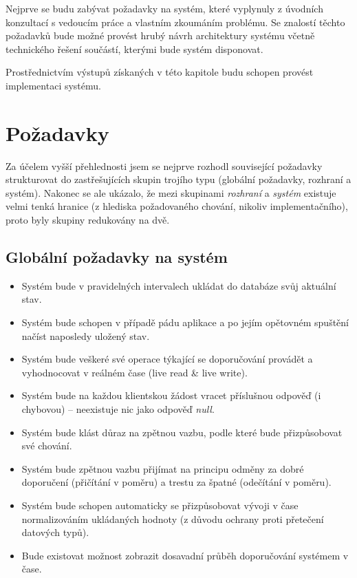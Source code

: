 \documentclass[thesis=M,czech]{FITthesis}[2014/05/07]
\begin{document}
Nejprve se budu zabývat požadavky na systém, které vyplynuly z úvodních konzultací s vedoucím práce a vlastním zkoumáním problému. Se znalostí těchto požadavků bude možné provést hrubý návrh architektury systému včetně technického řešení součástí, kterými bude systém disponovat.

Prostřednictvím výstupů získaných v této kapitole budu schopen provést implementaci systému.

\section{Požadavky}

Za účelem vyšší přehlednosti jsem se nejprve rozhodl související požadavky strukturovat do zastřešujících skupin trojího typu (globální požadavky, rozhraní a systém). Nakonec se ale ukázalo, že mezi skupinami \emph{rozhraní} a \emph{systém} existuje velmi tenká hranice (z hlediska požadovaného chování, nikoliv implementačního), proto byly skupiny redukovány na dvě.

\subsection{Globální požadavky na systém}

\begin{itemize}
	\item Systém bude v pravidelných intervalech ukládat do databáze svůj aktuální stav.
	\item Systém bude schopen v případě pádu aplikace a po jejím opětovném spuštění načíst naposledy uložený stav.
	\item Systém bude veškeré své operace týkající se doporučování provádět a vyhodnocovat v reálném čase (live read \& live write).
	\item Systém bude na každou klientskou žádost vracet příslušnou odpověď (i chybovou) – neexistuje nic jako odpověď \emph{null}.	
	\item Systém bude klást důraz na zpětnou vazbu, podle které bude přizpůsobovat své chování.
	\item Systém bude zpětnou vazbu přijímat na principu odměny za dobré doporučení (přičítání v poměru) a trestu za špatné (odečítání v poměru).
	\item Systém bude schopen automaticky se přizpůsobovat vývoji v čase normalizováním ukládaných hodnoty (z důvodu ochrany proti přetečení datových typů).
	\item Bude existovat možnost zobrazit dosavadní průběh doporučování systémem v čase.	
\end{itemize}
\end{document}
